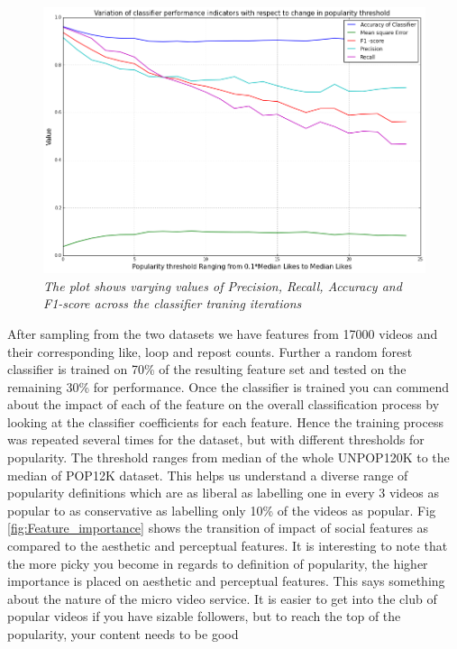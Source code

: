 \begin{figure}[!htb]
\centering
\includegraphics[width=\columnwidth]{plots/Classifier_performance_Likes}
\caption{\textsl{ The plot shows varying values of Precision, Recall, Accuracy and F1-score across the classifier traning iterations}}
\label{fig:Classifier_performance}
\end{figure}

After sampling from the two datasets we have features from 17000 videos and their corresponding like, loop and repost counts. Further a random forest classifier is trained on 70\% of the resulting feature set and tested on the remaining 30\% for performance.  Once the classifier is trained you can commend about the impact of each of the feature on the overall classification process by looking at the classifier coefficients for each feature. Hence the training process was repeated several times for the dataset, but with different thresholds for popularity. The threshold ranges from median of the whole UNPOP120K to the median of POP12K dataset. This helps us understand a diverse range of popularity definitions which are as liberal as labelling one in every 3 videos as popular to as conservative as labelling only 10\% of the videos as popular. Fig \ref{fig:Feature_importance} shows the transition of impact of social features as compared to the aesthetic and perceptual features. It is interesting to note that the more picky you become in regards to definition of popularity, the higher importance is placed on aesthetic and perceptual features. This says something about the nature of the micro video service. It is easier to get into the club of popular videos if you have sizable followers, but to reach the top of the popularity, your content needs to be good